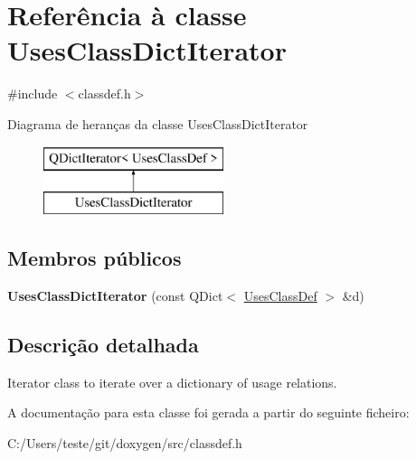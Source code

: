 \hypertarget{class_uses_class_dict_iterator}{\section{Referência à classe Uses\-Class\-Dict\-Iterator}
\label{class_uses_class_dict_iterator}
}


{\ttfamily \#include $<$classdef.\-h$>$}

Diagrama de heranças da classe Uses\-Class\-Dict\-Iterator\begin{figure}[H]
\begin{center}
\leavevmode
\includegraphics[height=2.000000cm]{class_uses_class_dict_iterator}
\end{center}
\end{figure}
\subsection*{Membros públicos}
\begin{DoxyCompactItemize}
\item 
\hypertarget{class_uses_class_dict_iterator_ade1195f47f12b862bda2483f598596fb}{{\bfseries Uses\-Class\-Dict\-Iterator} (const Q\-Dict$<$ \hyperlink{struct_uses_class_def}{Uses\-Class\-Def} $>$ \&d)}\label{class_uses_class_dict_iterator_ade1195f47f12b862bda2483f598596fb}

\end{DoxyCompactItemize}


\subsection{Descrição detalhada}
Iterator class to iterate over a dictionary of usage relations. 

A documentação para esta classe foi gerada a partir do seguinte ficheiro\-:\begin{DoxyCompactItemize}
\item 
C\-:/\-Users/teste/git/doxygen/src/classdef.\-h\end{DoxyCompactItemize}

